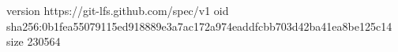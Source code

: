 version https://git-lfs.github.com/spec/v1
oid sha256:0b1fea55079115ed918889e3a7ac172a974eaddfcbb703d42ba41ea8be125c14
size 230564

